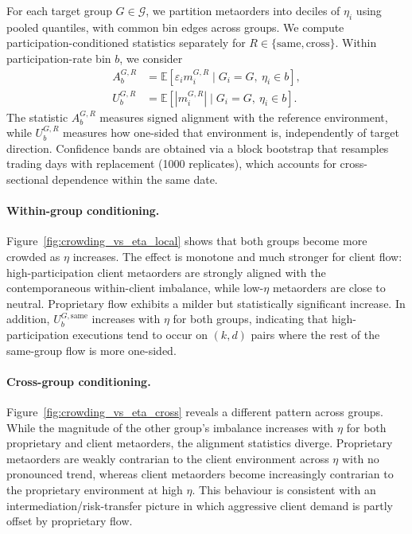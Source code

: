 \documentclass[11pt]{article}
\newcommand{\E}{\mathbb{E}}
\begin{document}
For each target group \(G\in\mathcal{G}\), we partition metaorders into deciles
of \(\eta_i\) using pooled quantiles, with common bin edges across groups. We
compute participation-conditioned statistics separately for
\(R\in\{\mathrm{same},\mathrm{cross}\}\). Within participation-rate bin \(b\),
we consider
\begin{align}
  A_b^{G,R}
  & = \E\!\left[\varepsilon_i m_i^{G,R}\mid G_i=G,\ \eta_i\in b\right],
  \\
  U_b^{G,R}
  &= \E\!\left[|m_i^{G,R}|\mid G_i=G,\ \eta_i\in b\right].
\end{align}
The statistic \(A_b^{G,R}\) measures signed alignment with the reference
environment, while \(U_b^{G,R}\) measures how one-sided that environment is,
independently of target direction. Confidence bands are obtained via a block
bootstrap that resamples trading days with replacement (1000 replicates), which
accounts for cross-sectional dependence within the same date.

\paragraph{Within-group conditioning.}
Figure~\ref{fig:crowding_vs_eta_local} shows that both groups become more
crowded as \(\eta\) increases. The effect is monotone and much stronger for
client flow: high-participation client metaorders are strongly aligned with the
contemporaneous within-client imbalance, while low-\(\eta\) metaorders are close
to neutral. Proprietary flow exhibits a milder but statistically significant
increase. In addition, \(U_b^{G,\mathrm{same}}\) increases with \(\eta\) for both
groups, indicating that high-participation executions tend to occur on \((k,d)\)
pairs where the rest of the same-group flow is more one-sided.

\paragraph{Cross-group conditioning.}
Figure~\ref{fig:crowding_vs_eta_cross} reveals a different pattern across
groups. While the magnitude of the other group's imbalance increases with
\(\eta\) for both proprietary and client metaorders, the alignment statistics
diverge. Proprietary metaorders are weakly contrarian to the client environment
across \(\eta\) with no pronounced trend, whereas client metaorders become
increasingly contrarian to the proprietary environment at high \(\eta\). This
behaviour is consistent with an intermediation/risk-transfer picture in which
aggressive client demand is partly offset by proprietary flow.
\end{document}
